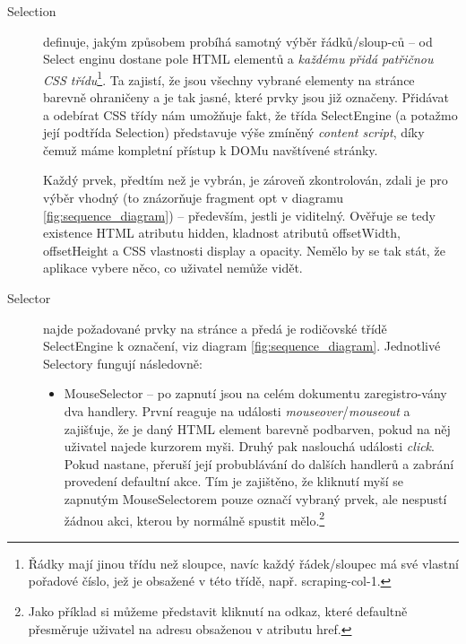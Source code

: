 \documentclass[thesis=B,czech]{FITthesis}[2012/06/26]
\begin{document}
\begin{description}
	\item[Selection] definuje, jakým způsobem probíhá samotný výběr řádků/sloup-ců -- od Select enginu dostane pole HTML elementů a \emph{každému přidá patřičnou CSS třídu}\footnote{Řádky mají jinou třídu než sloupce, navíc každý řádek/sloupec má své vlastní pořadové číslo, jež je obsažené v této třídě, např. \textsf{scraping-col-1}.}. Ta zajistí, že jsou všechny vybrané elementy na stránce barevně ohraničeny a je tak jasné, které prvky jsou již označeny. Přidávat a odebírat CSS třídy nám umožňuje fakt, že třída SelectEngine (a potažmo její podtřída Selection) představuje výše zmíněný \emph{content script}, díky čemuž máme kompletní přístup k DOMu navštívené stránky.
	
	Každý prvek, předtím než je vybrán, je zároveň zkontrolován, zdali je pro výběr vhodný (to znázorňuje fragment \textsf{opt} v diagramu \ref{fig:sequence_diagram}) -- především, jestli je viditelný. Ověřuje se tedy existence HTML atributu \textsf{hidden}, kladnost atributů \textsf{offsetWidth, offsetHeight} a CSS vlastnosti \textsf{display} a \textsf{opacity}. Nemělo by se tak stát, že aplikace vybere něco, co uživatel nemůže vidět.
	
	\item[Selector] najde požadované prvky na stránce a předá je rodičovské třídě SelectEngine k označení, viz diagram \ref{fig:sequence_diagram}. Jednotlivé Selectory fungují následovně:
	\begin{itemize}
		\item MouseSelector -- po zapnutí jsou na celém dokumentu zaregistro-vány dva handlery. První reaguje na události \emph{mouseover}/\emph{mouseout} a zajišťuje, že je daný HTML element barevně podbarven, pokud na něj uživatel najede kurzorem myši. Druhý pak naslouchá události \emph{click}. Pokud nastane, přeruší její probublávání do dalších handlerů a zabrání provedení defaultní akce. Tím je zajištěno, že kliknutí myší se zapnutým MouseSelectorem pouze označí vybraný prvek, ale nespustí žádnou akci, kterou by normálně spustit mělo.\footnote{Jako příklad si můžeme představit kliknutí na odkaz, které defaultně přesměruje uživatel na adresu obsaženou v atributu \textsf{href}.}
		

\end{itemize}
\end{description}
\end{document}
